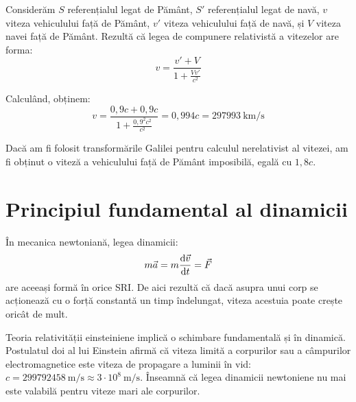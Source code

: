 \documentclass[a4paper, 12pt]{article}
\begin{document}
Considerăm $S$ referențialul legat de Pământ, $S'$ referențialul legat de navă,
$v$ viteza vehiculului față de Pământ, $v'$ viteza vehiculului față de navă, și
$V$ viteza navei față de Pământ. Rezultă că legea de compunere relativistă a
vitezelor are forma:
\[ v = \frac{v' + V}{1 + \frac{Vv'}{c^2}} \]

Calculând, obținem:
\[ v = \frac{0,9c + 0,9c}{1 + \frac{0,9^2 c^2}{c^2}} = 0,994c = 297993 ~ \mathrm{km/s} \]

Dacă am fi folosit transformările Galilei pentru calculul nerelativist al
vitezei, am fi obținut o viteză a vehiculului față de Pământ imposibilă, egală
cu $1,8c$.

\section{Principiul fundamental al dinamicii}

În mecanica newtoniană, legea dinamicii:
\[ m\vec{a} = m\dv{\vec{v}}{t} = \vec{F} \]
are aceeași formă în orice SRI. De aici rezultă că dacă asupra unui corp se
acționează cu o forță constantă un timp îndelungat, viteza acestuia poate
crește oricât de mult.

Teoria relativității einsteiniene implică o schimbare fundamentală și în
dinamică. Postulatul doi al lui Einstein afirmă că viteza limită a corpurilor
sau a câmpurilor electromagnetice este viteza de propagare a luminii în vid:
\( c = 299792458 ~ \mathrm{m/s} \approx 3 \cdot 10^8 ~ \mathrm{m/s} \).
Înseamnă că legea dinamicii newtoniene nu mai este valabilă pentru viteze mari
ale corpurilor.
\end{document}
